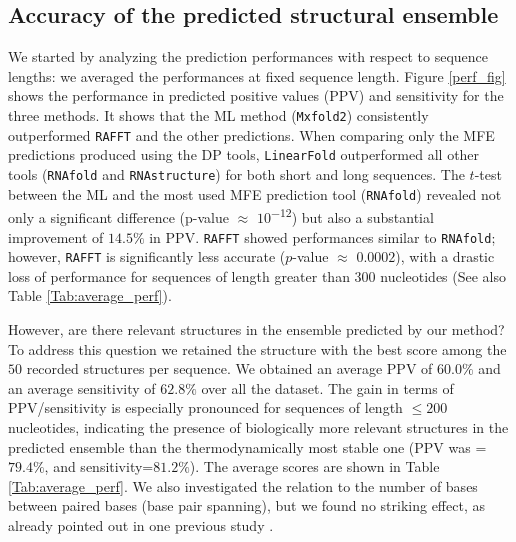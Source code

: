 \subsection{Accuracy of the predicted structural ensemble}
We started by analyzing the prediction performances with respect to sequence lengths: we averaged the performances at fixed sequence length. Figure \ref{perf_fig} shows the performance in predicted positive values (PPV) and sensitivity for the three methods. It shows that the ML method (\texttt{Mxfold2}) consistently outperformed \texttt{RAFFT} and the other predictions. When comparing only the MFE predictions produced using the DP tools, \texttt{LinearFold} outperformed all other tools (\texttt{RNAfold} and \texttt{RNAstructure}) for both short and long sequences. The $t$-test between the ML and the most used MFE prediction tool (\texttt{RNAfold}) revealed not only a significant difference (p-value \(\approx\) $10$\textsuperscript{$-12$}) but also a substantial improvement of $14.5\%$ in PPV. \texttt{RAFFT} showed performances similar to \texttt{RNAfold}; however, \texttt{RAFFT} is significantly less accurate ($p$-value \(\approx\) $0.0002$), with a drastic loss of performance for sequences of length greater than $300$ nucleotides (See also Table \ref{Tab:average_perf}).

However, are there relevant structures in the ensemble predicted by our method? To address this question we retained the structure with the best score among the $50$ recorded structures per sequence. We obtained an average PPV of $60.0\%$ and an average sensitivity of $62.8\%$ over all the dataset. The gain in terms of PPV/sensitivity is especially pronounced for sequences of length $\leq 200$ nucleotides, indicating the presence of biologically more relevant structures in the predicted ensemble than the thermodynamically most stable one (PPV was =$79.4\%$, and sensitivity=$81.2\%$). The average scores are shown in Table \ref{Tab:average_perf}. We also investigated the relation to the number of bases between paired bases (base pair spanning), but we found no striking effect, as already pointed out in one previous study \cite{amman13_troub_long_range_base_pairs_rna_foldin}.


